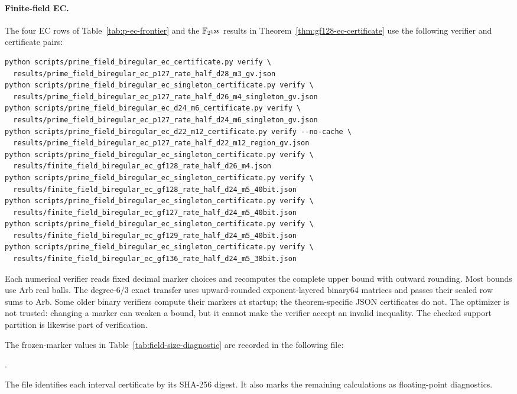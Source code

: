 \paragraph{Finite-field EC.}
The four EC rows of Table~\ref{tab:p-ec-frontier} and the
$\mathbb F_{2^{128}}$ results in Theorem~\ref{thm:gf128-ec-certificate} use the
following verifier and certificate pairs:
{\small
\begin{verbatim}
python scripts/prime_field_biregular_ec_certificate.py verify \
  results/prime_field_biregular_ec_p127_rate_half_d28_m3_gv.json
python scripts/prime_field_biregular_ec_singleton_certificate.py verify \
  results/prime_field_biregular_ec_p127_rate_half_d26_m4_singleton_gv.json
python scripts/prime_field_biregular_ec_d24_m6_certificate.py verify \
  results/prime_field_biregular_ec_p127_rate_half_d24_m6_singleton_gv.json
python scripts/prime_field_biregular_ec_d22_m12_certificate.py verify --no-cache \
  results/prime_field_biregular_ec_p127_rate_half_d22_m12_region_gv.json
python scripts/prime_field_biregular_ec_singleton_certificate.py verify \
  results/finite_field_biregular_ec_gf128_rate_half_d26_m4.json
python scripts/prime_field_biregular_ec_singleton_certificate.py verify \
  results/finite_field_biregular_ec_gf128_rate_half_d24_m5_40bit.json
python scripts/prime_field_biregular_ec_singleton_certificate.py verify \
  results/finite_field_biregular_ec_gf127_rate_half_d24_m5_40bit.json
python scripts/prime_field_biregular_ec_singleton_certificate.py verify \
  results/finite_field_biregular_ec_gf129_rate_half_d24_m5_40bit.json
python scripts/prime_field_biregular_ec_singleton_certificate.py verify \
  results/finite_field_biregular_ec_gf136_rate_half_d24_m5_38bit.json
\end{verbatim}
}

Each numerical verifier reads fixed decimal marker choices and recomputes the
complete upper bound with outward rounding.  Most bounds use Arb real balls.
The degree-$6/3$ exact transfer uses upward-rounded exponent-layered binary64
matrices and passes their scaled row sums to Arb.  Some older binary verifiers
compute their markers at startup; the theorem-specific JSON certificates do
not.  The optimizer is not trusted: changing a marker can weaken a bound, but
it cannot make the verifier accept an invalid inequality.  The checked
support partition is likewise part of verification.

The frozen-marker values in Table~\ref{tab:field-size-diagnostic} are recorded
in the following file:
\begin{center}
\small
{}.
\end{center}
The file identifies each interval certificate by its SHA-256 digest.  It also
marks the remaining calculations as floating-point diagnostics.

